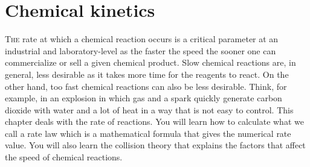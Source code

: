 \documentclass[main.tex]{subfiles}
\begin{document}
\linenumbers
  
\chapter[Chemical kinetics]{Chemical kinetics}

%


\lettrine[lines=4]{\color{black!45}T}{he} rate at which a chemical reaction occurs is a critical parameter at an industrial and laboratory-level as the faster the speed the sooner one can commercialize or sell a given chemical product. Slow chemical reactions are, in general, less desirable as it takes more time for the reagents to react. On the other hand, too fast chemical reactions can also be less desirable. Think, for example, in an explosion in which gas and a spark quickly generate carbon dioxide with water and a lot of heat in a way that is not easy to control. This chapter deals with the rate of reactions. You will learn how to calculate what we call a rate law which is a mathematical formula that gives the numerical rate value. You will also learn the collision theory that explains the factors that affect the speed of chemical reactions. 
\end{document}
